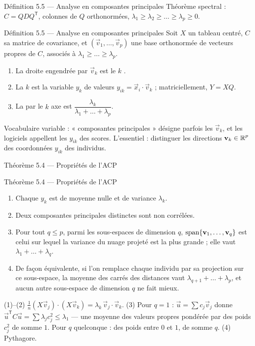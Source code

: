 \begin{frame}{Définition 5.5 --- Analyse en composantes principales}
  \small Théorème spectral : $C=QDQ^{\mathsf T}$, colonnes de $Q$
  orthonormées, $\lambda_1\geq\lambda_2\geq\dots\geq\lambda_p\geq0$.
  \begin{Enonce}{Définition 5.5 --- Analyse en composantes principales}
    Soit $X$ un tableau centré, $C$ sa matrice de covariance, et
    $(\vec v_1,\dots,\vec v_p)$ une base orthonormée de vecteurs propres de
    $C$, associés à $\lambda_1\geq\dots\geq\lambda_p$.
    \begin{enumerate}
      \item La droite engendrée par $\vec v_k$ est le $k$ .
      \item La $k$  est la variable $y_k$
        de valeurs $y_{ik}=\vec x_i\cdot\vec v_k$ ; matriciellement, $Y=XQ$.
      \item La  par le $k$ axe
        est $\dfrac{\lambda_k}{\lambda_1+\dots+\lambda_p}$.
    \end{enumerate}
  \end{Enonce}
  \small Vocabulaire variable : « composantes principales » désigne parfois
  les $\vec v_k$, et les logiciels appellent les $y_{ik}$ des scores.
  L'essentiel : distinguer les directions $\mathbf{v}_k\in\operatorname{\mathbb{R}}^p$ des
  coordonnées $y_{ik}$ des individus.
\end{frame}

\begin{frame}{Théorème 5.4 --- Propriétés de l'ACP}
  \begin{Enonce}{Théorème 5.4 --- Propriétés de l'ACP}
    \footnotesize
    \begin{enumerate}
      \item Chaque $y_k$ est de moyenne nulle et de variance $\lambda_k$.
      \item Deux composantes principales distinctes sont non corrélées.
      \item Pour tout $q\leq p$, parmi les sous-espaces de dimension $q$,
        $\operatorname{span}\{\mathbf{v}_1,\dots,\mathbf{v}_q\}$ est celui sur lequel la variance
        du nuage projeté est la plus grande ; elle vaut
        $\lambda_1+\dots+\lambda_q$.
      \item De façon équivalente, si l'on remplace chaque individu par sa
        projection sur ce sous-espace, la moyenne des carrés des distances
        vaut $\lambda_{q+1}+\dots+\lambda_p$, et aucun autre sous-espace de
        dimension $q$ ne fait mieux.
    \end{enumerate}
  \end{Enonce}
  \begin{AuTableau}
    \scriptsize (1)--(2) $\frac1n(X\vec v_j)\cdot(X\vec v_k)=\lambda_k\,\vec v_j\cdot\vec v_k$.
    (3) Pour $q=1$ : $\vec u=\sum c_j\vec v_j$ donne
    $\vec u^{\mathsf T}C\vec u=\sum\lambda_jc_j^2\leq\lambda_1$ --- une moyenne
    des valeurs propres pondérée par des poids $c_j^2$ de somme $1$. Pour
    $q$ quelconque : des poids entre $0$ et $1$, de somme $q$. (4)
    Pythagore.
  \end{AuTableau}
\end{frame}


